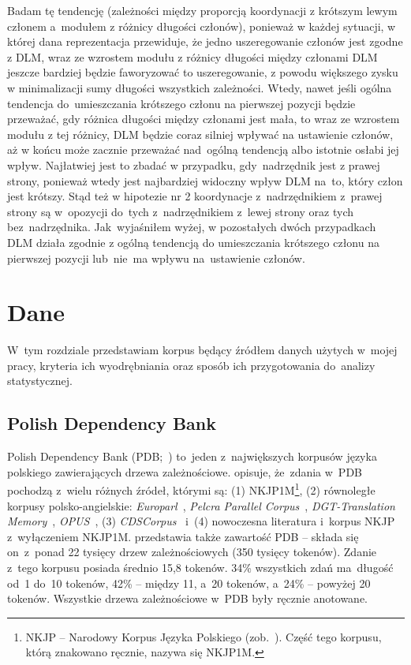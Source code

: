 \documentclass[licencjacka]{pracamgr_Kogni}
\begin{document}
    Badam tę tendencję (zależności między proporcją koordynacji z krótszym lewym członem a~modułem z różnicy długości członów), ponieważ w każdej sytuacji, w której dana reprezentacja przewiduje, że jedno uszeregowanie członów jest zgodne z DLM, wraz ze wzrostem modułu z różnicy długości między członami DLM jeszcze bardziej będzie faworyzować to uszeregowanie, z powodu większego zysku w minimalizacji sumy długości wszystkich zależności.
    Wtedy, nawet jeśli ogólna tendencja do~umieszczania krótszego członu na pierwszej pozycji będzie przeważać, gdy różnica długości między członami jest mała, to wraz ze wzrostem modułu z tej różnicy, DLM będzie coraz silniej wpływać na ustawienie członów, aż w końcu może zacznie przeważać nad~ogólną tendencją albo istotnie osłabi jej wpływ.
    Najłatwiej jest to zbadać w przypadku, gdy~nadrzędnik jest z prawej strony, ponieważ wtedy jest najbardziej widoczny wpływ DLM na~to, który człon jest krótszy.
    Stąd też w hipotezie nr 2 koordynacje z~nadrzędnikiem z~prawej strony są w~opozycji do~tych z~nadrzędnikiem z~lewej strony oraz tych bez~nadrzędnika.
    Jak~wyjaśniłem wyżej, w pozostałych dwóch przypadkach DLM działa zgodnie z ogólną tendencją do umieszczania krótszego członu na pierwszej pozycji lub~nie~ma wpływu na~ustawienie członów.

    \chapter{Dane}\label{ch:dane}
    W~tym rozdziale przedstawiam korpus będący źródłem danych użytych w~mojej pracy, kryteria ich wyodrębniania oraz sposób ich przygotowania do~analizy statystycznej.


    \section{Polish Dependency Bank}\label{sec:polish-dependency-bank}

    Polish Dependency Bank (PDB;~\citealp{Wroblewska2014}) to~jeden z~największych korpusów języka polskiego zawierających drzewa zależnościowe. \citet{Wroblewska2020} opisuje, że~zdania w~PDB pochodzą z~wielu różnych źródeł, którymi są: (1) NKJP1M\footnote{NKJP -- Narodowy Korpus Języka Polskiego (zob.~\citealt{Przepiorkowski2012}). Część tego korpusu, którą znakowano ręcznie, nazywa się NKJP1M.}, (2) równoległe korpusy polsko-angielskie: \textit{Europarl}~\citep{Koehn2005}, \textit{Pelcra Parallel Corpus}~\citep{Pezik2011}, \textit{DGT-Translation Memory}~\citep{Steinberger2012}, \textit{OPUS}~\citep{Tiedemann2012}, (3) \textit{CDSCorpus}~\citep{Wroblewska2017} i~(4) nowoczesna literatura i~korpus NKJP z~wyłączeniem NKJP1M\@.
    \citet{Wroblewska2020} przedstawia także zawartość PDB -- składa się on~z~ponad 22 tysięcy drzew zależnościowych (350 tysięcy tokenów).
    Zdanie z~tego korpusu posiada średnio 15,8 tokenów.
    34\% wszystkich zdań ma~długość od~1 do~10 tokenów, 42\% -- między 11, a~20 tokenów, a~24\% -- powyżej 20 tokenów.
    Wszystkie drzewa zależnościowe w~PDB były ręcznie anotowane.
\end{document}
